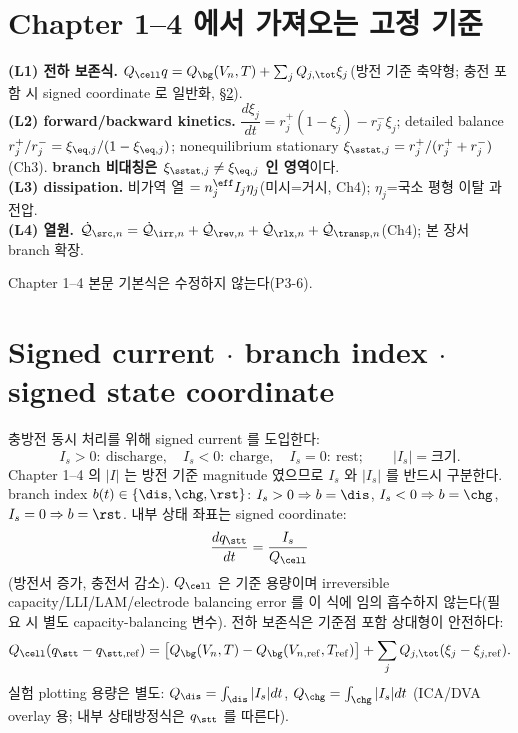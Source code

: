 \section{Chapter 1--4 에서 가져오는 고정 기준}\label{sec:ch5_inherit}
\begin{linkbox}
\textbf{(L1) 전하 보존식.} $Q_\cell q=Q_\bg(V_n,T)+\sum_j Q_{j,\tot}\xi_j$(방전 기준 축약형; 충전 포함 시
signed coordinate 로 일반화, \S\ref{sec:ch5_signed}).\\
\textbf{(L2) forward/backward kinetics.} $\dfrac{d\xi_j}{dt}=r_j^+(1-\xi_j)-r_j^-\xi_j$; detailed balance
$r_j^+/r_j^-=\xi_{\eq,j}/(1-\xi_{\eq,j})$; nonequilibrium stationary $\xi_{\sstat,j}=r_j^+/(r_j^++r_j^-)$
(Ch3). \textbf{branch 비대칭은 $\xi_{\sstat,j}\ne\xi_{\eq,j}$ 인 영역}이다.\\
\textbf{(L3) dissipation.} 비가역 열 $=n_j^{\eff}I_j\eta_j$(미시=거시, Ch4); $\eta_j$=국소 평형 이탈 과전압.\\
\textbf{(L4) 열원.} $\dot{\mathcal Q}_{\src,n}=\dot{\mathcal Q}_{\irr,n}+\dot{\mathcal Q}_{\rev,n}+\dot{\mathcal Q}_{\rlx,n}+\dot{\mathcal Q}_{\transp,n}$(Ch4); 본 장서 branch 확장.
\end{linkbox}
Chapter 1--4 본문 기본식은 수정하지 않는다(P3-6).

\section{Signed current $\cdot$ branch index $\cdot$ signed state coordinate}\label{sec:ch5_signed}
충방전 동시 처리를 위해 signed current 를 도입한다:
\begin{equation}
I_s>0:\ \text{discharge},\quad I_s<0:\ \text{charge},\quad I_s=0:\ \text{rest};\qquad |I_s|=\text{크기}.
\label{eq:ch5_signed_current}
\end{equation}
Chapter 1--4 의 $|I|$ 는 방전 기준 magnitude 였으므로 $I_s$ 와 $|I_s|$ 를 반드시 구분한다. branch index
$b(t)\in\{\dis,\chg,\rst\}$: $I_s>0\Rightarrow b=\dis$, $I_s<0\Rightarrow b=\chg$, $I_s=0\Rightarrow b=\rst$.
내부 상태 좌표는 signed coordinate:
\begin{equation}
\frac{dq_\stt}{dt}=\frac{I_s}{Q_\cell}
\label{eq:ch5_qstate}
\end{equation}
(방전서 증가, 충전서 감소). $Q_\cell$ 은 기준 용량이며 irreversible capacity/LLI/LAM/electrode balancing
error 를 이 식에 임의 흡수하지 않는다(필요 시 별도 capacity-balancing 변수). 전하 보존식은 기준점 포함 상대형이 안전하다:
\begin{equation}
Q_\cell(q_\stt-q_{\stt,\mathrm{ref}})=\big[Q_\bg(V_n,T)-Q_\bg(V_{n,\mathrm{ref}},T_{\mathrm{ref}})\big]+\sum_jQ_{j,\tot}(\xi_j-\xi_{j,\mathrm{ref}}).
\label{eq:ch5_relbalance}
\end{equation}
실험 plotting 용량은 별도: $Q_\dis=\int_\dis|I_s|dt$, $Q_\chg=\int_\chg|I_s|dt$ (ICA/DVA overlay 용; 내부
상태방정식은 $q_\stt$ 를 따른다).

